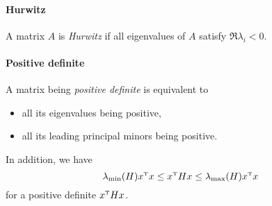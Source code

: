 \paragraph{Hurwitz}
A matrix $A$ is \emph{Hurwitz} if all eigenvalues of $A$ satisfy $\Re \lambda_i < 0$.

\paragraph{Positive definite} A matrix being \emph{positive definite} is equivalent to
\begin{itemize}
	\item all its eigenvalues being positive,
	\item all its leading principal minors being positive.
\end{itemize}
In addition, we have
\begin{equation}
	\lambda_{\mathrm{min}}(H) x^{\scriptscriptstyle \mathrm{T}} x \leq x^{\scriptscriptstyle \mathrm{T}} H x \leq \lambda_{\mathrm{max}}(H) x^{\scriptscriptstyle \mathrm{T}} x
\end{equation}
for a positive definite $x^{\scriptscriptstyle \mathrm{T}} H x$.